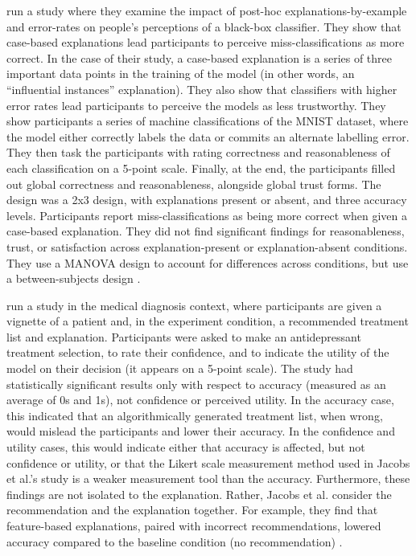 \textcite{ford_play_2020} run a study where they examine the impact of post-hoc explanations-by-example and error-rates on people's perceptions of a black-box classifier. They show that case-based explanations lead participants to perceive miss-classifications as more correct. In the case of their study, a case-based explanation is a series of three important data points in the training of the model (in other words, an “influential instances” explanation). They also show that classifiers with higher error rates lead participants to perceive the models as less trustworthy. They show participants a series of machine classifications of the MNIST dataset, where the model either correctly labels the data or commits an alternate labelling error. They then task the participants with rating correctness and reasonableness of each classification on a 5-point scale. Finally, at the end, the participants filled out global correctness and reasonableness, alongside global trust forms. The design was a 2x3 design, with explanations present or absent, and three accuracy levels. Participants report miss-classifications as being more correct when given a case-based explanation. They did not find significant findings for reasonableness, trust, or satisfaction across explanation-present or explanation-absent conditions. They use a MANOVA design to account for differences across conditions, but use a between-subjects design \cite{ford_play_2020}. 

\textcite{jacobs_how_2021} run a study in the medical diagnosis context, where participants are given a vignette of a patient and, in the experiment condition, a recommended treatment list and explanation. Participants were asked to make an antidepressant treatment selection, to rate their confidence, and to indicate the utility of the model on their decision (it appears on a 5-point scale). The study had statistically significant results only with respect to accuracy (measured as an average of 0s and 1s), not confidence or perceived utility. In the accuracy case, this indicated that an algorithmically generated treatment list, when wrong, would mislead the participants and lower their accuracy. In the confidence and utility cases, this would indicate either that accuracy is affected, but not confidence or utility, or that the Likert scale measurement method used in Jacobs et al.'s study is a weaker measurement tool than the accuracy. Furthermore, these findings are not isolated to the explanation. Rather, Jacobs et al. consider the recommendation and the explanation together. For example, they find that feature-based explanations, paired with incorrect recommendations, lowered accuracy compared to the baseline condition (no recommendation) \cite{jacobs_how_2021}. 

